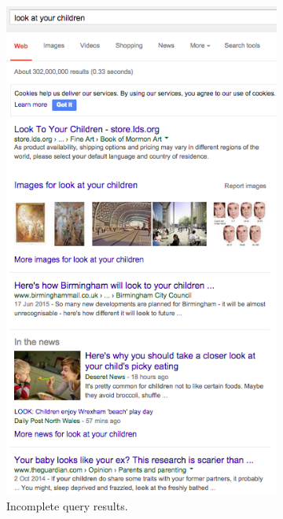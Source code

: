 \documentclass[a4paper, 11pt]{article}
\begin{document}
\begin{enumerate}
\begin{figure}[H]
\centering
\begin{subfigure}{.5\textwidth}
  \centering
  \includegraphics[width=.7\linewidth]{lookAtUrChildren}
  \caption{Incomplete query results.}
\end{subfigure}%
\begin{subfigure}{.5\textwidth}
  \centering

\end{subfigure}
\end{figure}
\end{enumerate}
\end{document}
